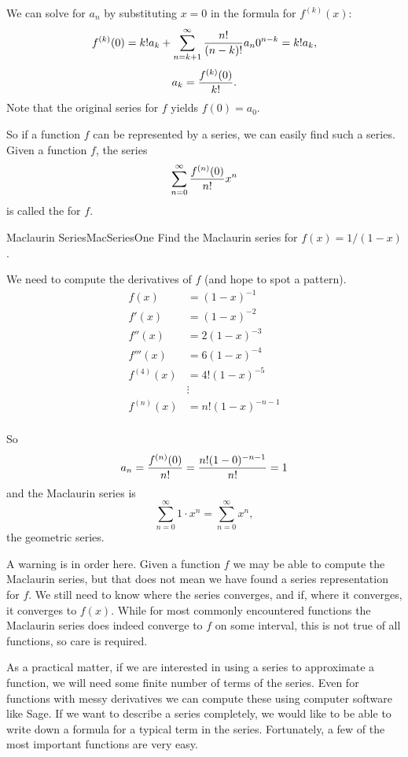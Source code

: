 We can solve for $a_n$ by substituting $x=0$ in the formula for $f^{(k)}(x)$:
\[f^{(k)}(0)=k!a_k+\sum_{n=k+1}^\infty {n!\over (n-k)!}a_n0^{n-k}=k!a_k,\]
\[a_k={f^{(k)}(0)\over k!}.\]
Note that the original series for $f$ yields $f(0)=a_0$.

So if a function $f$ can be represented by a series, we can easily find such a series.
Given a function $f$, the series
\[\sum_{n=0}^\infty {f^{(n)}(0)\over n!}x^n\]
is called the  for $f$.

\begin{example}{Maclaurin Series}{MacSeriesOne}
Find the Maclaurin series for $f(x)=1/(1-x)$.
\end{example}
\begin{solution}
We need to
compute the derivatives of $f$ (and hope to spot a pattern).
\begin{align*}
  f(x)&=(1-x)^{-1}	\\
  f'(x)&=(1-x)^{-2}	\\
  f''(x)&=2(1-x)^{-3}	\\
  f'''(x)&=6(1-x)^{-4}	\\
  f^{(4)}(x)&=4!(1-x)^{-5}	\\
  &\vdots	\\
  f^{(n)}(x)&=n!(1-x)^{-n-1}	\\
\end{align*}

So
\[a_n={f^{(n)}(0)\over n!}={n!(1-0)^{-n-1}\over n!}=1\]
and the Maclaurin series is
\[\sum_{n=0}^\infty 1\cdot x^n=\sum_{n=0}^\infty x^n,\]
the geometric series.
\end{solution}

A warning is in order here. Given a function $f$ we may be able to
compute the Maclaurin series, but that does not mean we have found a
series representation for $f$. We still need to know where the series
converges, and if, where it converges, it converges to $f(x)$. While
for most commonly encountered functions the Maclaurin series does
indeed converge to $f$ on some interval, this is not true of all
functions, so care is required.

As a practical matter, if we are interested in using a series to
approximate a function, we will need some finite number of terms of
the series. Even for functions with messy derivatives we can compute
these using computer software like Sage. If we want to describe a series
completely, we would like to be able to write down a formula for a typical
term in the series. Fortunately, a few of the most important functions are very
easy.

